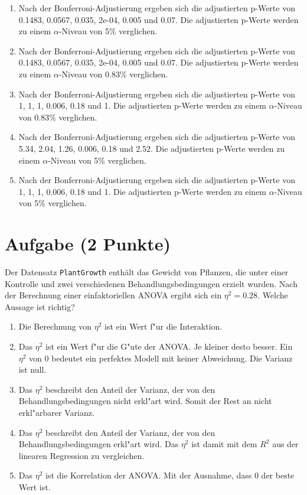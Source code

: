 \documentclass[a4paper, 10pt]{scrartcl}\usepackage[]{graphicx}\usepackage[]{xcolor}
\begin{document}
\begin{enumerate}
\item [\textbf{A} \msquare] Nach der Bonferroni-Adjustierung ergeben sich die adjustierten p-Werte von 0.1483, 0.0567, 0.035, 2e-04, 0.005 und 0.07. Die adjustierten p-Werte werden zu einem $\alpha$-Niveau von 5\% verglichen.
\item [\textbf{B} \msquare] Nach der Bonferroni-Adjustierung ergeben sich die adjustierten p-Werte von 0.1483, 0.0567, 0.035, 2e-04, 0.005 und 0.07. Die adjustierten p-Werte werden zu einem $\alpha$-Niveau von 0.83\% verglichen.
\item [\textbf{C} \msquare] Nach der Bonferroni-Adjustierung ergeben sich die adjustierten p-Werte von 1, 1, 1, 0.006, 0.18 und 1. Die adjustierten p-Werte werden zu einem $\alpha$-Niveau von 0.83\% verglichen.
\item [\textbf{D} \msquare] Nach der Bonferroni-Adjustierung ergeben sich die adjustierten p-Werte von 5.34, 2.04, 1.26, 0.006, 0.18 und 2.52. Die adjustierten p-Werte werden zu einem $\alpha$-Niveau von 5\% verglichen.
\item [\textbf{E} \msquare] Nach der Bonferroni-Adjustierung ergeben sich die adjustierten p-Werte von 1, 1, 1, 0.006, 0.18 und 1. Die adjustierten p-Werte werden zu einem $\alpha$-Niveau von 5\% verglichen.
\end{enumerate} 

\section{Aufgabe \hfill (2 Punkte)}



Der Datensatz \texttt{PlantGrowth} enth{\"a}lt das Gewicht von Pflanzen, die
unter einer Kontrolle und zwei verschiedenen Behandlungsbedingungen erzielt
wurden. Nach der Berechnung einer einfaktoriellen ANOVA ergibt sich ein
$\eta^2 = 0.28$. Welche Aussage ist richtig?



\begin{enumerate}
\item [\textbf{A} \msquare] Die Berechnung von $\eta^2$ ist ein Wert f{"u}r die Interaktion.
\item [\textbf{B} \msquare] Das $\eta^2$ ist ein Wert f{"u}r die G{"u}te der ANOVA. Je kleiner desto besser. Ein $\eta^2$ von 0 bedeutet ein perfektes Modell mit keiner Abweichung. Die Varianz ist null.
\item [\textbf{C} \msquare] Das $\eta^2$ beschreibt den Anteil der Varianz, der von den Behandlungsbedingungen nicht erkl{"a}rt wird. Somit der Rest an nicht erkl{"a}rbarer Varianz.
\item [\textbf{D} \msquare] Das $\eta^2$ beschreibt den Anteil der Varianz, der von den Behandlungsbedingungen erkl{"a}rt wird. Das $\eta^2$ ist damit mit dem $R^2$ aus der linearen Regression zu vergleichen.
\item [\textbf{E} \msquare] Das $\eta^2$ ist die Korrelation der ANOVA. Mit der Ausnahme, dass 0 der beste Wert ist.
\end{enumerate} 
\end{document}
